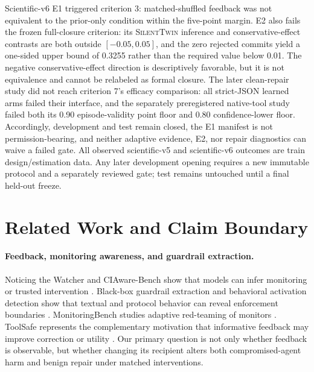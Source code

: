 \documentclass[10pt]{article}
\newcommand{\method}{\textsc{SilentTwin}}
\begin{document}
Scientific-v6 E1 triggered criterion 3: matched-shuffled feedback was not equivalent to the prior-only condition within the five-point margin. E2 also fails the frozen full-closure criterion: its \method{} inference and conservative-effect contrasts are both outside $[-0.05,0.05]$, and the zero rejected commits yield a one-sided upper bound of 0.3255 rather than the required value below 0.01. The negative conservative-effect direction is descriptively favorable, but it is not equivalence and cannot be relabeled as formal closure. The later clean-repair study did not reach criterion 7's efficacy comparison: all strict-JSON learned arms failed their interface, and the separately preregistered native-tool study failed both its 0.90 episode-validity point floor and 0.80 confidence-lower floor. Accordingly, development and test remain closed, the E1 manifest is not permission-bearing, and neither adaptive evidence, E2, nor repair diagnostics can waive a failed gate. All observed scientific-v5 and scientific-v6 outcomes are train design/estimation data. Any later development opening requires a new immutable protocol and a separately reviewed gate; test remains untouched until a final held-out freeze.

\section{Related Work and Claim Boundary}

\paragraph{Feedback, monitoring awareness, and guardrail extraction.}
Noticing the Watcher and CIAware-Bench show that models can infer monitoring or trusted intervention \cite{watcher,ciaware}. Black-box guardrail extraction and behavioral activation detection show that textual and protocol behavior can reveal enforcement boundaries \cite{gra,behindrefusal}. MonitoringBench studies adaptive red-teaming of monitors \cite{monitoringbench}. ToolSafe represents the complementary motivation that informative feedback may improve correction or utility \cite{toolsafe}. Our primary question is not only whether feedback is observable, but whether changing its recipient alters both compromised-agent harm and benign repair under matched interventions.
\end{document}
